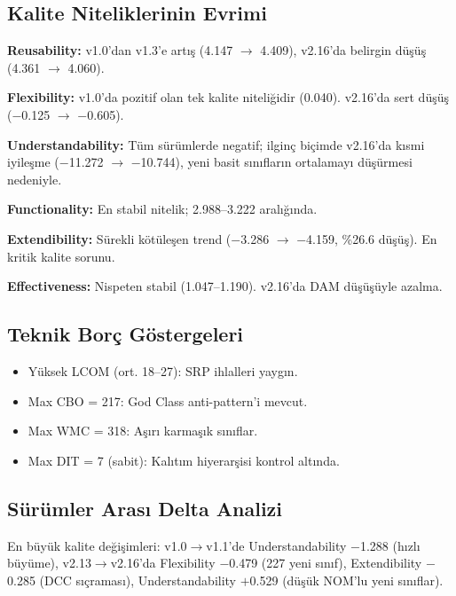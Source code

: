 \documentclass[conference]{IEEEtran}
\begin{document}
\subsection{Kalite Niteliklerinin Evrimi}

\textbf{Reusability:} v1.0'dan v1.3'e art{\i}\c{s} (4.147 $\rightarrow$ 4.409), v2.16'da belirgin d\"u\c{s}\"u\c{s} (4.361 $\rightarrow$ 4.060).

\textbf{Flexibility:} v1.0'da pozitif olan tek kalite niteli\u{g}idir (0.040). v2.16'da sert d\"u\c{s}\"u\c{s} ($-$0.125 $\rightarrow$ $-$0.605).

\textbf{Understandability:} T\"um s\"ur\"umlerde negatif; ilgin\c{c} bi\c{c}imde v2.16'da k{\i}smi iyile\c{s}me ($-$11.272 $\rightarrow$ $-$10.744), yeni basit s{\i}n{\i}flar{\i}n ortalamay{\i} d\"u\c{s}\"urmesi nedeniyle.

\textbf{Functionality:} En stabil nitelik; 2.988--3.222 aral{\i}\u{g}{\i}nda.

\textbf{Extendibility:} S\"urekli k\"ot\"ule\c{s}en trend ($-$3.286 $\rightarrow$ $-$4.159, \%26.6 d\"u\c{s}\"u\c{s}). En kritik kalite sorunu.

\textbf{Effectiveness:} Nispeten stabil (1.047--1.190). v2.16'da DAM d\"u\c{s}\"u\c{s}\"uyle azalma.

\subsection{Teknik Bor\c{c} G\"ostergeleri}
\begin{itemize}
\item Y\"uksek LCOM (ort. 18--27): SRP ihlalleri yayg{\i}n.
\item Max CBO = 217: God Class anti-pattern'i mevcut.
\item Max WMC = 318: A\c{s}{\i}r{\i} karma\c{s}{\i}k s{\i}n{\i}flar.
\item Max DIT = 7 (sabit): Kal{\i}t{\i}m hiyerar\c{s}isi kontrol alt{\i}nda.
\end{itemize}

\subsection{S\"ur\"umler Aras{\i} Delta Analizi}
En b\"uy\"uk kalite de\u{g}i\c{s}imleri: v1.0$\rightarrow$v1.1'de Understandability $-$1.288 (h{\i}zl{\i} b\"uy\"ume), v2.13$\rightarrow$v2.16'da Flexibility $-$0.479 (227 yeni s{\i}n{\i}f), Extendibility $-$0.285 (DCC s{\i}\c{c}ramas{\i}), Understandability $+$0.529 (d\"u\c{s}\"uk NOM'lu yeni s{\i}n{\i}flar).
\end{document}

